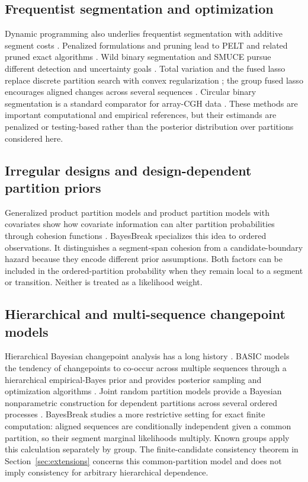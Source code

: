 \subsection{Frequentist segmentation and optimization}
Dynamic programming also underlies frequentist segmentation with additive segment costs \citep{auger1989segment,jackson2005optpart}. Penalized formulations and pruning lead to PELT and related pruned exact algorithms \citep{killick2012pelt,rigaill2010pruned}. Wild binary segmentation and SMUCE pursue different detection and uncertainty goals \citep{fryzlewicz2014wbs,frick2014smuce}. Total variation and the fused lasso replace discrete partition search with convex regularization \citep{rudin1992rof,tibshirani2005fused}; the group fused lasso encourages aligned changes across several sequences \citep{bleakley2011groupfused}. Circular binary segmentation is a standard comparator for array-CGH data \citep{olshen2004cbs}. These methods are important computational and empirical references, but their estimands are penalized or testing-based rather than the posterior distribution over partitions considered here.

\subsection{Irregular designs and design-dependent partition priors}
Generalized product partition models and product partition models with covariates show how covariate information can alter partition probabilities through cohesion functions \citep{park2010gppm,muller2011ppmx}. BayesBreak specializes this idea to ordered observations. It distinguishes a segment-span cohesion from a candidate-boundary hazard because they encode different prior assumptions. Both factors can be included in the ordered-partition probability when they remain local to a segment or transition. Neither is treated as a likelihood weight.

\subsection{Hierarchical and multi-sequence changepoint models}
Hierarchical Bayesian changepoint analysis has a long history \citep{carlin1992hierBayesCP}. BASIC models the tendency of changepoints to co-occur across multiple sequences through a hierarchical empirical-Bayes prior and provides posterior sampling and optimization algorithms \citep{fan2017basic}. Joint random partition models provide a Bayesian nonparametric construction for dependent partitions across several ordered processes \citep{quinlan2024jrpm}. BayesBreak studies a more restrictive setting for exact finite computation: aligned sequences are conditionally independent given a common partition, so their segment marginal likelihoods multiply. Known groups apply this calculation separately by group. The finite-candidate consistency theorem in Section~\ref{sec:extensions} concerns this common-partition model and does not imply consistency for arbitrary hierarchical dependence.

